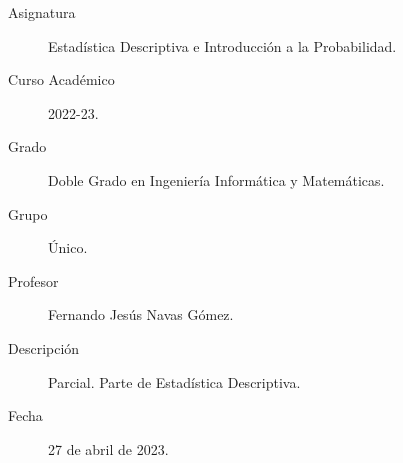 \documentclass[12pt]{article}
\begin{document}

    
    

    \begin{description}
        \item[Asignatura] Estadística Descriptiva e Introducción a la Probabilidad.
        \item[Curso Académico] 2022-23.
        \item[Grado] Doble Grado en Ingeniería Informática y Matemáticas.
        \item[Grupo] Único.
        \item[Profesor] Fernando Jesús Navas Gómez.
        \item[Descripción] Parcial. Parte de Estadística Descriptiva.
        \item[Fecha] 27 de abril de 2023.
    
    \end{description}
    \newpage
    
\end{document}
